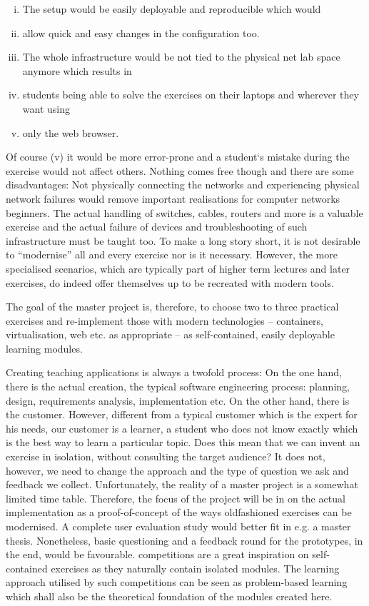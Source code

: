 \begin{enumerate}[(i)]
	\item The setup would be easily deployable and reproducible which would
	\item allow quick and easy changes in the configuration too.
	\item The whole infrastructure would be not tied to the physical net lab space anymore which results in
	\item students being able to solve the exercises on their laptops and wherever they want using
	\item only the web browser.
\end{enumerate}
Of course (v) it would be more error-prone and a student‘s mistake
during the exercise would not affect others.
Nothing comes free though and there are some disadvantages:
Not physically connecting the networks and experiencing physical network failures would remove important realisations for computer networks beginners.
The actual handling of switches, cables, routers and more is a valuable exercise and the actual failure of devices and troubleshooting of such infrastructure must be taught too.
To make a long story short, it is not desirable to \enquote{modernise}
all and every exercise nor is it necessary.
However, the more specialised scenarios,
which are typically part of higher term lectures and later exercises,
do indeed offer themselves up to be recreated with modern tools.

The goal of the master project is, therefore, to choose two to three practical exercises and re-implement those with modern technologies -- containers, virtualisation, web etc. as appropriate  -- as self-contained, easily deployable learning modules.

Creating teaching applications is always a twofold process:
On the one hand, there is the actual creation, the typical software engineering process:
planning, design, requirements analysis, implementation etc.
On the other hand, there is the customer.
However, different from a typical customer which is the expert for his needs, our customer is a learner, a student who does not know exactly which is the best way to learn a particular topic.
Does this mean that we can invent an exercise in isolation, without consulting the target audience?
It does not, however, we need to change the approach and the type of question we ask and feedback we collect.
Unfortunately, the reality of a master project is a somewhat limited time table.
Therefore, the focus of the project will be in on the actual implementation as a proof-of-concept of the ways oldfashioned exercises can be modernised. 
A complete user evaluation study would better fit in e.g. a master thesis.
Nonetheless, basic questioning and a feedback round for the prototypes, in the end, would be favourable.
 competitions are a great inspiration on self-contained exercises as they naturally contain isolated modules.
The learning approach utilised by such competitions can be seen as problem-based learning which shall also be the theoretical foundation of the modules created here.

